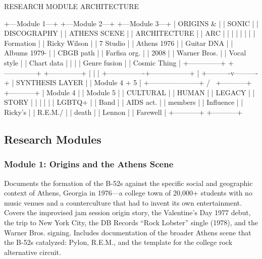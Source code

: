 \documentclass[11pt,letterpaper]{article}
\begin{document}
\begin{asciibox}
RESEARCH MODULE ARCHITECTURE

+---Module 1---+  +---Module 2---+  +---Module 3---+
| ORIGINS &    |  | SONIC        |  | DISCOGRAPHY  |
| ATHENS SCENE |  | ARCHITECTURE |  | ARC          |
|              |  |              |  |              |
| Formation    |  | Ricky Wilson |  | 7 Studio     |
| Athens 1976  |  | Guitar DNA   |  | Albums 1979- |
| CBGB path    |  | Farfisa org. |  | 2008         |
| Warner Bros. |  | Vocal style  |  | Chart data   |
|              |  | Genre fusion |  | Cosmic Thing |
+--------------+  +--------------+  +--------------+
        |                |                 |
        +----------------+-----------------+
                         |
              +----------v----------+
              |   SYNTHESIS LAYER   |
              |  Module 4 + 5       |
              +---------------------+
                    /         \
        +-----------+           +-----------+
        | Module 4  |           | Module 5  |
        | CULTURAL  |           | HUMAN     |
        | LEGACY    |           | STORY     |
        |           |           |           |
        | LGBTQ+    |           | Band      |
        | AIDS act. |           | members   |
        | Influence |           | Ricky's   |
        | R.E.M./   |           | death     |
        | Lennon    |           | Farewell  |
        +-----------+           +-----------+
\end{asciibox}

\subsection{Research Modules}

\subsubsection{Module 1: Origins and the Athens Scene}

Documents the formation of the B-52s against the specific social and geographic context of Athens, Georgia in 1976---a college town of 20,000+ students with no music venues and a counterculture that had to invent its own entertainment. Covers the improvised jam session origin story, the Valentine's Day 1977 debut, the trip to New York City, the DB Records ``Rock Lobster'' single (1978), and the Warner Bros. signing. Includes documentation of the broader Athens scene that the B-52s catalyzed: Pylon, R.E.M., and the template for the college rock alternative circuit.
\end{document}
